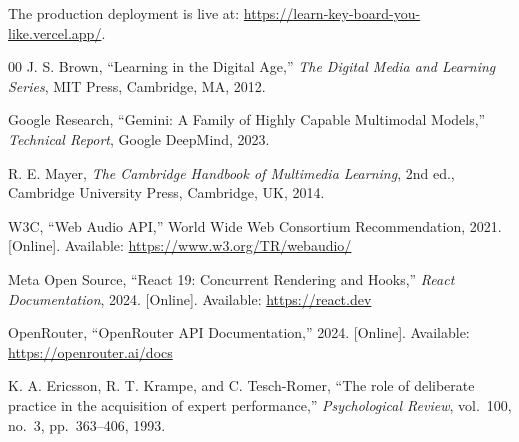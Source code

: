 \documentclass[conference]{IEEEtran}
\begin{document}
The production deployment is live at:
\url{https://learn-key-board-you-like.vercel.app/}.

\begin{thebibliography}{00}
J. S. Brown, ``Learning in the Digital Age,''
\textit{The Digital Media and Learning Series},
MIT Press, Cambridge, MA, 2012.

Google Research, ``Gemini: A Family of Highly Capable Multimodal
Models,'' \textit{Technical Report}, Google DeepMind, 2023.

R. E. Mayer, \textit{The Cambridge Handbook of Multimedia Learning},
2nd ed., Cambridge University Press, Cambridge, UK, 2014.

W3C, ``Web Audio API,'' World Wide Web Consortium Recommendation,
2021. [Online]. Available: \url{https://www.w3.org/TR/webaudio/}

Meta Open Source, ``React 19: Concurrent Rendering and Hooks,''
\textit{React Documentation}, 2024. [Online].
Available: \url{https://react.dev}

OpenRouter, ``OpenRouter API Documentation,'' 2024. [Online].
Available: \url{https://openrouter.ai/docs}

K. A. Ericsson, R. T. Krampe, and C. Tesch-Romer,
``The role of deliberate practice in the acquisition of expert
performance,'' \textit{Psychological Review}, vol.~100, no.~3,
pp.~363--406, 1993.
\end{thebibliography}
\end{document}
